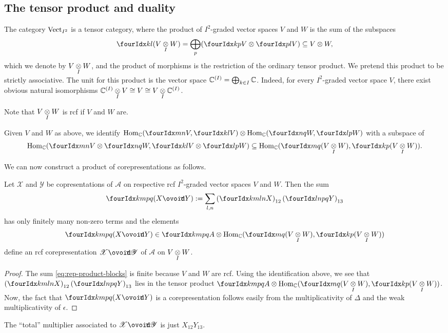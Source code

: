 \subsection{The tensor product and duality}
The category $\mathrm{Vect}_{I^{2}}$ is a tensor category, where
the product of $I^{2}$-graded vector spaces $V$ and $W$ is the sum of
the subspaces
\begin{align*}
 \Gru{(V\itimes W)}{k}{l} =
  \bigoplus_{p} (\Gru{V}{k}{p}\otimes \Gru{V}{p}{l}) \subseteq
  V\otimes W,
\end{align*}
which we denote by $V \underset{I}{\otimes} W$, and the product of morphisms is the
restriction of the ordinary tensor product.  We pretend this product
to be strictly associative.  The unit for this product is the vector
space $\mathbb{C}^{(I)}=\bigoplus_{k\in I} \mathbb{C}$. Indeed, for every
$I^{2}$-graded vector space $V$, there exist obvious natural
isomorphisms $\mathbb{C}^{(I)} \underset{I}{\otimes} V \cong V \cong V \underset{I}{\otimes} \mathbb{C}^{(I)}$.

Note that $V\underset{I}{\otimes} W$ is  rcf if $V$ and $W$ are.

Given $V$ and $W$ as above, we identify $\Hom_\C(\Gru{V}{m}{n},\Gru{V}{k}{l})\otimes
   \Hom_\C(\Gru{W}{n}{q},\Gru{W}{l}{p})$ with a subspace of
\begin{align*}
   \Hom_\C(\Gru{V}{m}{n}\otimes
   \Gru{W}{n}{q},\Gru{V}{k}{l}\otimes \Gru{W}{l}{p})\subseteq
   \Hom_\C(\Gru{(V\itimes
     W)}{m}{q},\Gru{(V\itimes W)}{k}{p}).
\end{align*}


We can now construct a product of corepresentations as follows.
\begin{Lem} Let $\mathscr{X}$ and $\mathscr{Y}$ be copresentations of
  $\mathscr{A}$ on respective  rcf $I^{2}$-graded vector spaces $V$ and
  $W$. Then the sum
  \begin{align} \label{eq:rep-product-blocks}
     \Gr{(X\Circt Y)}{k}{p}{m}{q} := \sum_{l,n}
    \left(\Gr{X}{k}{l}{m}{n}\right)_{12}\left(\Gr{Y}{l}{p}{n}{q}\right)_{13}
  \end{align}
  has only finitely many non-zero terms and the elements
 \[\Gr{(X\Circt
    Y)}{k}{p}{m}{q}\in \Gr{A}{k}{p}{m}{q} \otimes
  \Hom_\C(\Gru{(V\itimes W)}{m}{q},\Gru{(V\itimes W)}{k}{p})
\]
define an rcf corepresentation $\mathscr{X} \Circt \mathscr{Y}$ of
$\mathscr{A}$ on $V\underset{I}{\otimes} W$. 
\end{Lem} 
\begin{proof}
  The sum \eqref{eq:rep-product-blocks} is finite because $V$ and
  $W$ are  rcf. Using the identification above, we
  see that
 $
  \left(\Gr{X}{k}{l}{m}{n}\right)_{12}\left(\Gr{Y}{l}{p}{n}{q}\right)_{13}
  $ lies in the tensor product $ \Gr{A}{k}{p}{m}{q} \otimes \Hom_\C(\Gru{(V\itimes
    W)}{m}{q},\Gru{(V\itimes W)}{k}{p})$. Now,   the fact that $\Gr{(X\Circt
    Y)}{k}{p}{m}{q}$ is a corepresentation follows easily
  from the multiplicativity of $\Delta$ and the weak multiplicativity
  of $\epsilon$.
\end{proof}
\begin{Rem} \label{remark:rep-tensor-multiplier}
  The ``total'' multiplier associated to $\mathscr{X}\Circt
  \mathscr{Y}$   is  just $X_{12}Y_{13}$.
\end{Rem}

